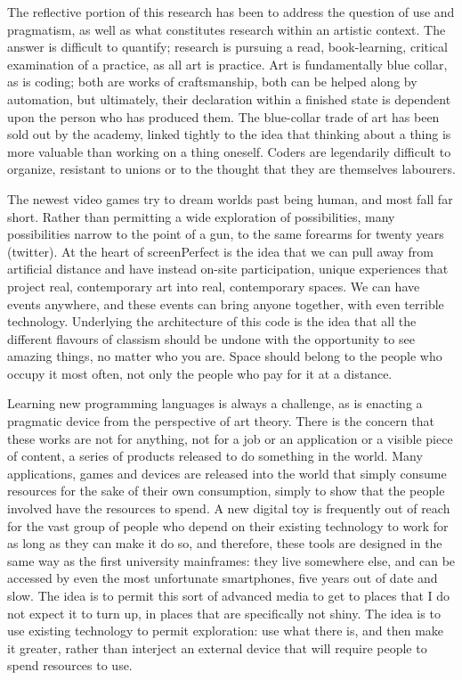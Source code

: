 The reflective portion of this research has been to address the question of use and pragmatism, as well as what constitutes research within an artistic context. The answer is difficult to quantify; research is pursuing a read, book-learning, critical examination of a practice, as all art is practice. Art is fundamentally blue collar, as is coding; both are works of craftsmanship, both can be helped along by automation, but ultimately, their declaration within a finished state is dependent upon the person who has produced them. The blue-collar trade of art has been sold out by the academy, linked tightly to the idea that thinking about a thing is more valuable than working on a thing oneself. Coders are legendarily difficult to organize, resistant to unions or to the thought that they are themselves labourers.

The newest video games try to dream worlds past being human, and most fall far short. Rather than permitting a wide exploration of possibilities, many possibilities narrow to the point of a gun, to the same forearms for twenty years (twitter). At the heart of screenPerfect is the idea that we can pull away from artificial distance and have instead on-site participation, unique experiences that project real, contemporary art into real, contemporary spaces. We can have events anywhere, and these events can bring anyone together, with even terrible technology. Underlying the architecture of this code is the idea that all the different flavours of classism should be undone with the opportunity to see amazing things, no matter who you are. Space should belong to the people who occupy it most often, not only the people who pay for it at a distance.

Learning new programming languages is always a challenge, as is enacting a pragmatic device from the perspective of art theory. There is the concern that these works are not for anything, not for a job or an application or a visible piece of content, a series of products released to do something in the world. Many applications, games and devices are released into the world that simply consume resources for the sake of their own consumption, simply to show that the people involved have the resources to spend. A new digital toy is frequently out of reach for the vast group of people who depend on their existing technology to work for as long as they can make it do so, and therefore, these tools are designed in the same way as the first university mainframes: they live somewhere else, and can be accessed by even the most unfortunate smartphones, five years out of date and slow. The idea is to permit this sort of advanced media to get to places that I do not expect it to turn up, in places that are specifically not shiny. The idea is to use existing technology to permit exploration: use what there is, and then make it greater, rather than interject an external device that will require people to spend resources to use.

